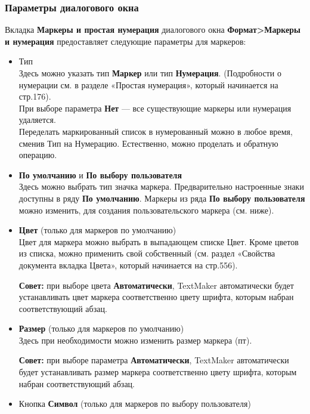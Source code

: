 \documentclass[a4paper,10pt]{article}
\begin{document}
\subsubsection{Параметры диалогового окна}
Вкладка \textbf{Маркеры и простая нумерация} диалогового окна \textbf{Формат>Маркеры и нумерация} предоставляет следующие параметры для маркеров:
\begin{itemize}
 \item Тип\\
 Здесь можно указать тип \textbf{Маркер} или тип \textbf{Нумерация}. (Подробности о нумерации см. в разделе «Простая нумерация», который начинается на стр.176).\\
При выборе параметра \textbf{Нет} --- все существующие маркеры или нумерация удаляется.\\
Переделать маркированный список в нумерованный можно в любое время, сменив Тип на Нумерацию. Естественно, можно проделать и обратную операцию.
\item \textbf{По умолчанию} и \textbf{По выбору пользователя}\\
Здесь можно выбрать тип значка маркера. Предварительно настроенные знаки доступны в ряду \textbf{По умолчанию}. Маркеры из ряда \textbf{По выбору пользователя} можно изменить, для создания пользовательского маркера (см. ниже).
\item \textbf{Цвет} (только для маркеров по умолчанию)\\
Цвет для маркера можно выбрать в выпадающем списке Цвет. Кроме цветов из списка, можно применить свой собственный (см. раздел «Свойства документа вкладка Цвета», который начинается на стр.556).
\begin{mdframed}[backgroundcolor=blue!10]
\textbf{Совет:} при выборе цвета \textbf{Автоматически}, TextMaker автоматически будет устанавливать цвет маркера соответственно цвету шрифта, которым набран соответствующий абзац.
\end{mdframed}
\item \textbf{Размер} (только для маркеров по умолчанию)\\
Здесь при необходимости можно изменить размер маркера (пт).
\begin{mdframed}[backgroundcolor=blue!10]
\textbf{Совет:} при выборе параметра \textbf{Автоматически}, TextMaker автоматически будет устанавливать размер маркера соответственно цвету шрифта, которым набран соответствующий абзац.
\end{mdframed}
\item Кнопка \textbf{Символ} (только для маркеров по выбору пользователя)\\

\end{itemize}
\end{document}
